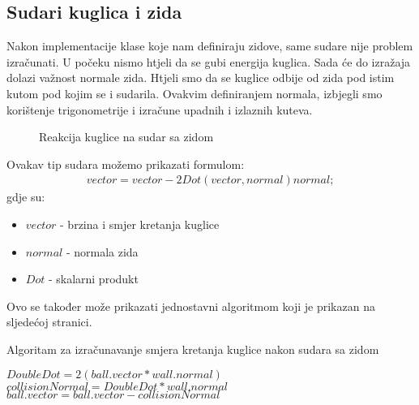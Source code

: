 \subsection{Sudari kuglica i zida}
Nakon implementacije klase koje nam definiraju zidove, same sudare nije problem izračunati. U počeku nismo htjeli da se gubi energija kuglica. Sada će do izražaja dolazi važnost normale zida. Htjeli smo da se kuglice odbije od zida pod istim kutom pod kojim se i sudarila. Ovakvim definiranjem normala, izbjegli smo korištenje trigonometrije i izračune upadnih i izlaznih kuteva.
\begin{figure}[!http]
	\begin{center}
	\end{center}
	\caption {Reakcija kuglice na sudar sa zidom}
	\label{fig:21}
\end{figure}
Ovakav tip sudara možemo prikazati formulom:
\begin{equation}\label{equ:wall_collision}
		\begin{aligned}
			vector = vector - 2Dot(vector, normal) normal;
		\end{aligned}
\end{equation}
gdje su:
\begin{itemize}
	\item $vector$ - brzina i smjer kretanja kuglice
	\item $normal$ - normala zida
	\item $Dot$ - skalarni produkt
\end{itemize}
Ovo se također može prikazati jednostavni algoritmom koji je prikazan na sljedećoj stranici.\newpage
\begin{algorithm}
	\caption{Algoritam za izračunavanje smjera kretanja kuglice nakon sudara sa zidom}
	\label{alg:resolve_Wallcollision}
	\begin{algorithmic}
		\Return
		\EndIf
		\State $DoubleDot = 2  (ball.vector * wall.normal)$
		\State $collisionNormal = DoubleDot * wall.normal$
		\State $ball.vector = ball.vector - collisionNormal$
		\EndFunction
	\end{algorithmic}
\end{algorithm}

